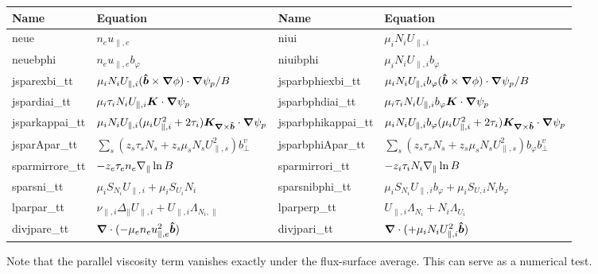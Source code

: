 \begin{longtable}{llll}
\toprule
\rowcolor{gray!50}\textbf{Name} &  \textbf{Equation} &
\textbf{Name} &  \textbf{Equation}\\
\midrule
    neue &$n_e u_{\parallel,e}$ &
    niui &$\mu_i N_i U_{\parallel,i}$ \\
    neuebphi &$n_eu_{\parallel,e}b_\varphi$ &
    niuibphi &$\mu_i N_iU_{\parallel,i}b_\varphi$ \\
    jsparexbi\_tt       & $\mu_i N_iU_{\parallel,i}(\bm{\hat{b}}\times{\boldsymbol{\nabla}}\phi)\cdot{\boldsymbol{\nabla}} \psi_p/B$ &
    jsparbphiexbi\_tt   & $\mu_i N_iU_{\parallel,i}b_\varphi(\bm{\hat{b}}\times{\boldsymbol{\nabla}}\phi)\cdot{\boldsymbol{\nabla}} \psi_p/B$ \\
    jspardiai\_tt       & $\mu_i \tau_i N_iU_{\parallel,i}{\boldsymbol{K}}\cdot{\boldsymbol{\nabla}}\psi_p$ &
    jsparbphdiai\_tt   & $\mu_i \tau_i N_iU_{\parallel,i}b_\varphi{\boldsymbol{K}}\cdot{\boldsymbol{\nabla}}\psi_p$ \\
    jsparkappai\_tt       & $\mu_i N_iU_{\parallel,i} ( \mu_i U_{\parallel,i}^2 + 2\tau_i){\boldsymbol{K}}_{{\boldsymbol{\nabla}}\times \bm{\hat{b}}}\cdot{\boldsymbol{\nabla}}\psi_p$ &
    jsparbphikappai\_tt       & $\mu_i N_iU_{\parallel,i}b_\varphi ( \mu_i U_{\parallel,i}^2 + 2\tau_i){\boldsymbol{K}}_{{\boldsymbol{\nabla}}\times \bm{\hat{b}}}\cdot{\boldsymbol{\nabla}}\psi_p$ \\
    jsparApar\_tt       & $\sum_s (z_s \tau_s N_s + z_s \mu_s N_s U_{\parallel,s}^2)b_\perp^v$ &
    jsparbphiApar\_tt   & $\sum_s (z_s \tau_s N_s + z_s \mu_s N_s U_{\parallel,s}^2)b_\varphi b_\perp^v$ \\
    sparmirrore\_tt & $-z_e\tau_en_e\nabla_\parallel \ln B$ &
    sparmirrori\_tt & $-z_i\tau_iN_i\nabla_\parallel \ln B$ \\
    sparsni\_tt & $\mu_i S_{N_i} U_{\parallel,i} + \mu_i S_{U_i} N_i $ &
    sparsnibphi\_tt & $\mu_i S_{N_i} U_{\parallel,i}b_\varphi + \mu_i S_{U,i} N_i b_\varphi $ \\
    lparpar\_tt   & $\nu_{\parallel,i} \Delta_\parallel U_{\parallel,i} + U_{\parallel,i} \Lambda_{N_i,\parallel}$ &
    lparperp\_tt & $U_{\parallel,i} \Lambda_{N_i} + N_i\Lambda_{U_i} $ \\
    divjpare\_tt & $ {\boldsymbol{\nabla}}\cdot( -\mu_e n_e u_{\parallel,e}^2 \bm{\hat{b}})$ &
    divjpari\_tt & $ {\boldsymbol{\nabla}}\cdot( +\mu_i N_i U_{\parallel,i}^2 \bm{\hat{b}})$ \\
\bottomrule
\end{longtable}
Note that the parallel viscosity term vanishes exactly under the flux-surface average. This can serve as a numerical test.

